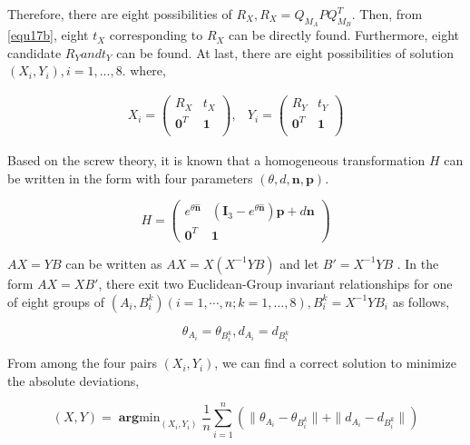 \documentclass[letterpaper, 10 pt, conference]{ieeeconf}  %
\begin{document}
Therefore, there are eight possibilities of $R_{X}, R_{X}=Q_{M_{A}}PQ_{M_{B}}^T$. Then, from \ref{equ17b}, eight $t_{X}$ corresponding to $R_{X}$ can be directly found. Furthermore, eight candidate $R_{Y} and t_{Y}$ can be found. At last, there are eight possibilities of solution $(X_{i},Y_{i}), i = 1,\dots,8$.
where,

\begin{equation}\label{equ20}
\begin{array}{cc}
X_{i}= \left( \begin{array}{cc}
       R_{X} & t_{X} \\
       \mathbf{0}^{T} & \mathbf{1}\\
\end{array} \right),&
Y_{i}= \left( \begin{array}{cc}
       R_{Y} & t_{Y} \\
       \mathbf{0}^{T} & \mathbf{1}\\
\end{array} \right)
\end{array}
\end{equation}

Based on the screw theory, it is known that a homogeneous transformation $H$ can be written in the form with four parameters $(\theta,d,\mathbf{n},\mathbf{p})$.

\begin{equation}\label{equ21}
H = \left( \begin{array}{cc}
       e^{\theta \hat{\mathbf{n}}} & (\mathbf{I}_{3} - e^{\theta \hat{\mathbf{n}}})\mathbf{p} + d\mathbf{n} \\
       \mathbf{0}^{T} & \mathbf{1}
\end{array} \right)
\end{equation}

$AX=YB$ can be written as $AX=X(X^{-1}YB)$ and let $B' = X^{-1}YB$ . In the form $AX=XB'$, there exit two Euclidean-Group invariant relationships for one of eight groups of $(A_{i},B_{i}^k)( i = 1,\cdots,n; k=1,\dots,8), B_i^{k} = X^{-1}YB_i$ as follows,

\begin{equation}\label{equ22}
    \theta_{A_{i}}=\theta_{B_{i}^{k}}, d_{A_{i}}=d_{B_{i}^{k}}
\end{equation}

From among the four pairs $(X_{i},Y_{i})$, we can find a correct solution to minimize the absolute deviations,

\begin{equation}\label{equ23}
    (X,Y) = \mathop{\mathbf{arg}min}_{(X_{i},Y_{i})}\frac{1}{n} \sum_{i=1}^{n} (\parallel \theta_{A_{i}}-\theta_{B_{i}^{k}} \parallel + \parallel d_{A_{i}}-d_{B_{i}^{k}} \parallel)
\end{equation}
\end{document}
